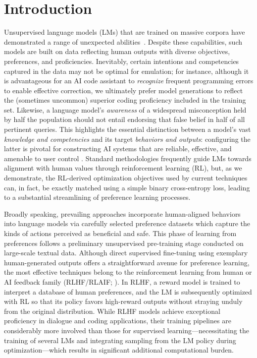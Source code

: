 \section{Introduction}
Unsupervised language models (LMs) that are trained on massive corpora have demonstrated a range of unexpected abilities~\citep{chowdhery2022palm, brown2020language, touvron2023llama,bubeck2023sparks}. Despite these capabilities, such models are built on data reflecting human outputs with diverse objectives, preferences, and proficiencies. Inevitably, certain intentions and competencies captured in the data may not be optimal for emulation; for instance, although it is advantageous for an AI code assistant to \textit{recognize} frequent programming errors to enable effective correction, we ultimately prefer model generations to reflect the (sometimes uncommon) superior coding proficiency included in the training set. Likewise, a language model’s \textit{awareness} of a widespread misconception held by half the population should not entail endorsing that false belief in half of all pertinent queries. This highlights the essential distinction between a model’s vast \textit{knowledge and competencies} and its target \emph{behaviors and outputs}: configuring the latter is pivotal for constructing AI systems that are reliable, effective, and amenable to user control \citep{ouyang2022training}. Standard methodologies frequently guide LMs towards alignment with human values through reinforcement learning (RL), but, as we demonstrate, the RL-derived optimization objectives used by current techniques can, in fact, be exactly matched using a simple binary cross-entropy loss, leading to a substantial streamlining of preference learning processes.

Broadly speaking, prevailing approaches incorporate human-aligned behaviors into language models via carefully selected preference datasets which capture the kinds of actions perceived as beneficial and safe. This phase of learning from preferences follows a preliminary unsupervised pre-training stage conducted on large-scale textual data. Although direct supervised fine-tuning using exemplary human-generated outputs offers a straightforward avenue for preference learning, the most effective techniques belong to the reinforcement learning from human or AI feedback family (RLHF/RLAIF; \citep{christiano2017deep,bai2022constitutional}). In RLHF, a reward model is trained to interpret a database of human preferences, and the LM is subsequently optimized with RL so that its policy favors high-reward outputs without straying unduly from the original distribution. While RLHF models achieve exceptional proficiency in dialogue and coding applications, their training pipelines are considerably more involved than those for supervised learning—necessitating the training of several LMs and integrating sampling from the LM policy during optimization—which results in significant additional computational burden.

